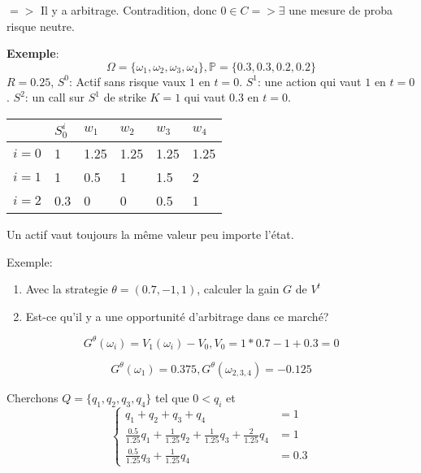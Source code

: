 \documentclass{article}
\begin{document}
$=>$ Il y a arbitrage. Contradition, donc $0\in C => \exists $ une mesure de proba risque neutre.

\textbf{Exemple}:
\begin{equation}
\Omega=\{\omega_1, \omega_2,\omega_3, \omega_4\}, \mathbb{P}=\{0.3, 0.3,0.2,0.2\}
\end{equation}
$R=0.25$, $S^0$: Actif sans risque vaux $1$ en $t=0$.
$S^1$: une action qui vaut $1$ en $t=0$.
$S^2$: un call sur $S^1$ de strike $K=1$ qui vaut $0.3$ en $t=0$.
\begin{center}
\begin{tabular}{l||l|l|l|l|l}
		& $S_0^i$ & $w_1$ & $w_2$ & $w_3$ & $w_4$\\ \hline \hline
	$i=0$ & 1 & 1.25 & 1.25 & 1.25 & 1.25 \\	 \hline 
	$i=1$ & 1 & 0.5 & 1 & 1.5 & 2 \\ \hline 
	$i=2$ & 0.3 & 0 & 0 & 0.5 & 1 \\ 
\end{tabular}
\end{center}

Un actif vaut toujours la m\^{e}me valeur peu importe l'\'etat.

Exemple:
\begin{enumerate}
	\item Avec la strategie $\theta=(0.7, -1, 1)$, calculer la gain $G$ de $V^t$
	\item Est-ce qu'il y a une opportunit\'e d'arbitrage dans ce march\'e?
\end{enumerate}

\begin{equation}
G^\theta(\omega_i)=V_1(\omega_i)-V_0, V_0=1*0.7-1+0.3=0
\end{equation}

\begin{equation}
G^\theta(\omega_1)=0.375, G^\theta(\omega_{2,3,4})=-0.125
\end{equation}

Cherchons $Q=\{q_1,q_2,q_3,q_4\}$ tel que $0<q_i$ et
\begin{equation}
\left\{ \begin{array}{rcl}
	q_1+q_2+q_3+q_4 &= 1 \\
	\frac{0.5}{1.25} q_1+\frac{1}{1.25} q_2+\frac{1}{1.25} q_3 + \frac{2}{1.25} q_4 &= 1 \\
	\frac{0.5}{1.25} q_3 + \frac{1}{1.25} q_4 &=0.3
\end{array}\right.
\end{equation}
\end{document}
